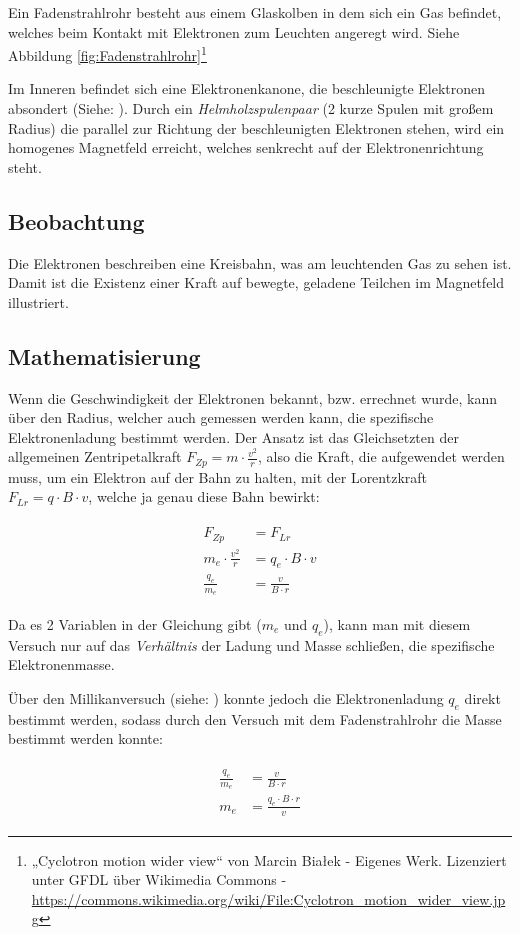 Ein Fadenstrahlrohr besteht aus einem Glaskolben in dem sich ein Gas befindet, welches beim Kontakt mit Elektronen zum Leuchten angeregt wird. Siehe Abbildung \ref{fig:Fadenstrahlrohr}\footnote{„Cyclotron motion wider view“ von Marcin Białek - Eigenes Werk. Lizenziert unter GFDL über Wikimedia Commons - \url{https://commons.wikimedia.org/wiki/File:Cyclotron\_motion\_wider\_view.jpg}}

Im Inneren befindet sich eine Elektronenkanone, die beschleunigte Elektronen absondert (Siehe: ). Durch ein \emph{Helmholzspulenpaar} (2 kurze Spulen mit großem Radius) die parallel zur Richtung der beschleunigten Elektronen stehen, wird ein homogenes Magnetfeld erreicht, welches senkrecht auf der Elektronenrichtung steht.

\subsection{Beobachtung}

Die Elektronen beschreiben eine Kreisbahn, was am leuchtenden Gas zu sehen ist. Damit ist die Existenz einer Kraft auf bewegte, geladene Teilchen im Magnetfeld illustriert.

\subsection{Mathematisierung}

Wenn die Geschwindigkeit der Elektronen bekannt, bzw. errechnet wurde, kann über den Radius, welcher auch gemessen werden kann, die spezifische Elektronenladung bestimmt werden. Der Ansatz ist das Gleichsetzten der allgemeinen Zentripetalkraft $F_{Zp} = m \cdot \frac{v^2}{r}$, also die Kraft, die aufgewendet werden muss, um ein Elektron auf der Bahn zu halten, mit der Lorentzkraft  $F_{Lr} = q \cdot B \cdot v$, welche ja genau diese Bahn bewirkt:

\begin{align}
\begin{split}
	F_{Zp} &= F_{Lr} \\
	m_e \cdot \frac{v^2}{r} &= q_e \cdot B \cdot v \\
	\frac{q_e}{m_e} &=\frac{v}{B \cdot r}
\end{split}
\end{align}

\noindent Da es 2 Variablen in der Gleichung gibt ($m_e$ und $q_e$), kann man mit diesem Versuch nur auf das \emph{Verhältnis} der Ladung und Masse schließen, die \glqq spezifische Elektronenmasse\grqq .

Über den Millikanversuch (siehe: ) konnte jedoch die Elektronenladung $q_e$ direkt bestimmt werden, sodass durch den Versuch mit dem Fadenstrahlrohr die Masse bestimmt werden konnte:

\begin{align}
\begin{split}
	\frac{q_e}{m_e} &=\frac{v}{B \cdot r} \\
	m_e &=\frac{q_e \cdot B \cdot r}{v}
\end{split}
\end{align}





